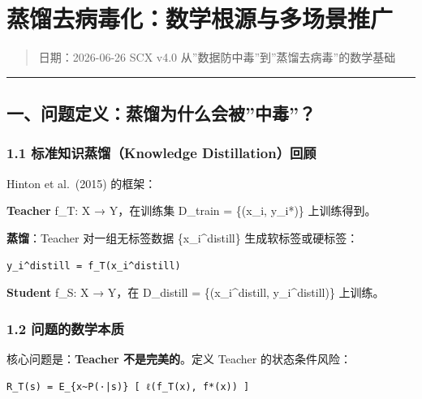\documentclass[
  12pt,
]{ctexart}
\author{SCX}
\date{2026}
\begin{document}
\section{蒸馏去病毒化：数学根源与多场景推广}\label{ux84b8ux998fux53bbux75c5ux6bd2ux5316ux6570ux5b66ux6839ux6e90ux4e0eux591aux573aux666fux63a8ux5e7f}

\begin{quote}
日期：2026-06-26 \textbar{} SCX v4.0 \textbar{}
从''数据防中毒''到''蒸馏去病毒''的数学基础
\end{quote}

\begin{center}\rule{0.5\linewidth}{0.5pt}\end{center}

\subsection{一、问题定义：蒸馏为什么会被''中毒''？}\label{ux4e00ux95eeux9898ux5b9aux4e49ux84b8ux998fux4e3aux4ec0ux4e48ux4f1aux88abux4e2dux6bd2}

\subsubsection{1.1 标准知识蒸馏（Knowledge
Distillation）回顾}\label{ux6807ux51c6ux77e5ux8bc6ux84b8ux998fknowledge-distillationux56deux987e}

Hinton et al.~(2015) 的框架：

\textbf{Teacher} f\_T: X → Y，在训练集 D\_train = \{(x\_i, y\_i*)\}
上训练得到。

\textbf{蒸馏}：Teacher 对一组无标签数据 \{x\_i\^{}distill\}
生成软标签或硬标签：

\begin{verbatim}
y_i^distill = f_T(x_i^distill)
\end{verbatim}

\textbf{Student} f\_S: X → Y，在 D\_distill = \{(x\_i\^{}distill,
y\_i\^{}distill)\} 上训练。

\subsubsection{1.2
问题的数学本质}\label{ux95eeux9898ux7684ux6570ux5b66ux672cux8d28}

核心问题是：\textbf{Teacher 不是完美的}。定义 Teacher 的状态条件风险：

\begin{verbatim}
R_T(s) = E_{x~P(·|s)} [ ℓ(f_T(x), f*(x)) ]
\end{verbatim}
\end{document}
